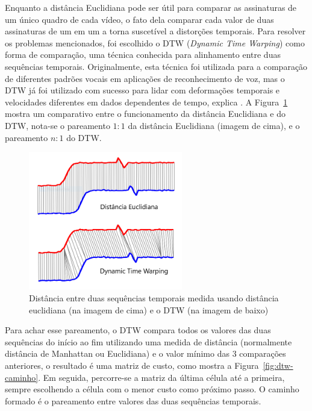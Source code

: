 Enquanto a distância Euclidiana pode ser útil para comparar as assinaturas de um único quadro de cada vídeo, o fato dela comparar cada valor de duas assinaturas de um em um a torna suscetível a distorções temporais. Para resolver os problemas mencionados, foi escolhido o DTW (\textit{Dynamic Time Warping}) como forma de comparação, uma técnica conhecida para alinhamento entre duas sequências temporais. Originalmente, esta técnica foi utilizada para a comparação de diferentes padrões vocais em aplicações de reconhecimento de voz, mas o DTW já foi utilizado com sucesso para lidar com deformações temporais e velocidades diferentes em dados dependentes de tempo, explica \citeauthor{muller2007dynamic}. A Figura~\ref{fig:dist-comparacao} mostra um comparativo entre o funcionamento da distância Euclidiana e do DTW, nota-se o pareamento $1:1$ da distância Euclidiana (imagem de cima), e o pareamento $n:1$ do DTW.

\begin{figure}[h]
    \centering
    \caption{Distância entre duas sequências temporais medida usando distância euclidiana (na imagem de cima) e o DTW (na imagem de baixo)}
    \label{fig:dist-comparacao}
    \includegraphics[width=0.6\textwidth]{dados/figuras/dtw-euclidiana.png}
\end{figure}

Para achar esse pareamento, o DTW compara todos os valores das duas sequências do início ao fim utilizando uma medida de distância (normalmente distância de Manhattan ou Euclidiana) e o valor mínimo das 3 comparações anteriores, o resultado é uma matriz de custo, como mostra a Figura~\ref{fig:dtw-caminho}. Em seguida, percorre-se a matriz da última célula até a primeira, sempre escolhendo a célula com o menor custo como próximo passo. O caminho formado é o pareamento entre valores das duas sequências temporais.


